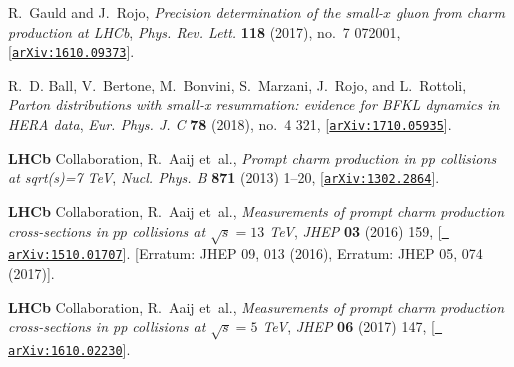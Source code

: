 \documentclass[11pt,a4paper]{article}
\begin{document}
\begin{thebibliography}{10}
  R.~Gauld and J.~Rojo, {\it {Precision determination of the small-$x$ gluon from
    charm production at LHCb}},  {\em Phys. Rev. Lett.} {\bf 118} (2017), no.~7
    072001, [\href{http://arxiv.org/abs/1610.09373}{{\tt arXiv:1610.09373}}].
  
  R.~D. Ball, V.~Bertone, M.~Bonvini, S.~Marzani, J.~Rojo, and L.~Rottoli, {\it
    {Parton distributions with small-x resummation: evidence for BFKL dynamics in
    HERA data}},  {\em Eur. Phys. J. C} {\bf 78} (2018), no.~4 321,
    [\href{http://arxiv.org/abs/1710.05935}{{\tt arXiv:1710.05935}}].
  
  {\bf LHCb} Collaboration, R.~Aaij et~al., {\it {Prompt charm production in pp
    collisions at sqrt(s)=7 TeV}},  {\em Nucl. Phys. B} {\bf 871} (2013) 1--20,
    [\href{http://arxiv.org/abs/1302.2864}{{\tt arXiv:1302.2864}}].
  
  {\bf LHCb} Collaboration, R.~Aaij et~al., {\it {Measurements of prompt charm
    production cross-sections in $pp$ collisions at $ \sqrt{s}=13 $ TeV}},  {\em
    JHEP} {\bf 03} (2016) 159, [\href{http://arxiv.org/abs/1510.01707}{{\tt
    arXiv:1510.01707}}]. [Erratum: JHEP 09, 013 (2016), Erratum: JHEP 05, 074
    (2017)].
  
  {\bf LHCb} Collaboration, R.~Aaij et~al., {\it {Measurements of prompt charm
    production cross-sections in pp collisions at $ \sqrt{s}=5 $ TeV}},  {\em
    JHEP} {\bf 06} (2017) 147, [\href{http://arxiv.org/abs/1610.02230}{{\tt
    arXiv:1610.02230}}].
  
  \end{thebibliography}\endgroup
  
\end{document}
